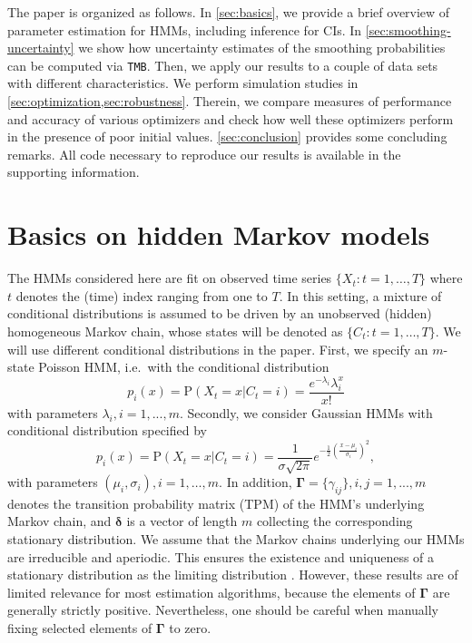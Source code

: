 \documentclass[]{interact}\usepackage[]{graphicx}\usepackage[dvipsnames]{xcolor}
\theoremstyle{plain}%
\theoremstyle{definition}
\theoremstyle{remark}
\begin{document}
The paper is organized as follows. In \autoref{sec:basics}, we provide a brief overview of parameter estimation for HMMs, including inference for CIs. In \autoref{sec:smoothing-uncertainty} we show how uncertainty estimates of the smoothing probabilities can be computed via {\tt{TMB}}. Then, we apply our results to a couple of data sets with different characteristics. We perform simulation studies in \cref{sec:optimization,sec:robustness}. Therein, we compare measures of performance and accuracy of various optimizers and check how well these optimizers perform in the presence of poor initial values. \autoref{sec:conclusion} provides some concluding remarks. All code necessary to reproduce our results is available in the supporting information.



\section{Basics on hidden Markov models}
\label{sec:basics}

The HMMs considered here are fit on observed time series $\{X_t: t = 1, \ldots, T\}$ where $t$ denotes the (time) index ranging from one to $T$. In this setting, a mixture of conditional distributions is assumed to be driven by an unobserved (hidden) homogeneous Markov chain, whose states will be denoted as $\{C_t : t = 1, \ldots, T\}$. We will use different conditional distributions in the paper. First, we specify an $m$-state Poisson HMM, i.e.~with the conditional distribution
\begin{equation*}
p_i(x) = \text{P}(X_t = x \vert C_t = i) = \frac{e^{-\lambda_i} \lambda_i^x}{x!}
\end{equation*}
with parameters $\lambda_i, i = 1,...,m$. Secondly, we consider Gaussian HMMs with conditional distribution specified by
\begin{equation*}
p_i(x) = \text{P}(X_t = x \vert C_t = i) = \frac{1}{\sigma \sqrt{2 \pi}} e^{-\frac{1}{2} \left( \frac{x - \mu_i}{ \sigma_i} \right)^2 },
\end{equation*}
with parameters $(\mu_i, \sigma_i), i = 1, \ldots, m$. In addition,  $\bm{\Gamma} = \{\gamma_{ij}\}, i,j=1,...,m$ denotes the transition probability matrix (TPM) of the HMM's underlying Markov chain, and $\bm{\delta}$ is a vector of length $m$ collecting the corresponding stationary distribution. We assume that the Markov chains underlying our HMMs are irreducible and aperiodic. This ensures the existence and uniqueness of a stationary distribution as the limiting distribution \citep{Feller}. However, these results are of limited relevance for most estimation algorithms, because the elements of $\bm{\Gamma}$ are generally strictly positive. Nevertheless, one should be careful when manually fixing selected elements of $\bm{\Gamma}$ to zero.
\end{document}
